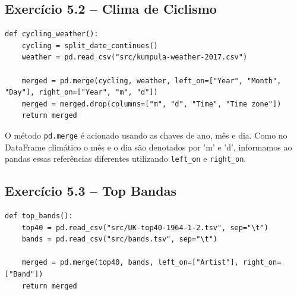 \documentclass[11pt,a4paper]{article}
\begin{document}
\subsection*{Exercício 5.2 -- Clima de Ciclismo}
\begin{solucao}
\begin{lstlisting}
def cycling_weather():
    cycling = split_date_continues()
    weather = pd.read_csv("src/kumpula-weather-2017.csv")
    
    merged = pd.merge(cycling, weather, left_on=["Year", "Month", "Day"], right_on=["Year", "m", "d"])
    merged = merged.drop(columns=["m", "d", "Time", "Time zone"])
    return merged
\end{lstlisting}
O método \texttt{pd.merge} é acionado usando as chaves de ano, mês e dia. Como no DataFrame climático o mês e o dia são denotados por 'm' e 'd', informamos ao pandas essas referências diferentes utilizando \texttt{left\_on} e \texttt{right\_on}.
\end{solucao}

\subsection*{Exercício 5.3 -- Top Bandas}
\begin{solucao}
\begin{lstlisting}
def top_bands():
    top40 = pd.read_csv("src/UK-top40-1964-1-2.tsv", sep="\t")
    bands = pd.read_csv("src/bands.tsv", sep="\t")
    
    merged = pd.merge(top40, bands, left_on=["Artist"], right_on=["Band"])
    return merged
\end{lstlisting}
\end{solucao}
\end{document}

